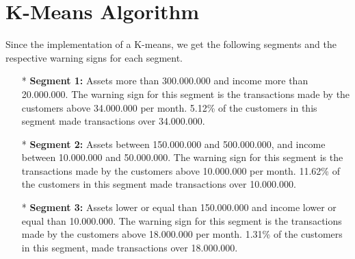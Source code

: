 \section{K-Means Algorithm}
Since the implementation of a K-means, we get the following segments and the respective warning signs for each segment.
\begin{itemize}
\item[*] \textbf{Segment 1:}
Assets more than 300.000.000 and income more than 20.000.000.
The warning sign for this segment is the transactions made by the customers above 34.000.000 per month. 5.12\% of the customers in this segment made transactions over 34.000.000.
\item[*] \textbf{Segment 2:}
Assets between 150.000.000 and 500.000.000, and income between 10.000.000 and 50.000.000.
The warning sign for this segment is the transactions made by the customers above 10.000.000 per month. 11.62\% of the customers in this segment made transactions over 10.000.000.
\item[*] \textbf{Segment 3:}
Assets lower or equal than 150.000.000 and income lower or equal than 10.000.000.
The warning sign for this segment is the transactions made by the customers above 18.000.000 per month. 1.31\% of the customers in this segment, made transactions over 18.000.000.
\end{itemize}
\clearemptydoublepage
